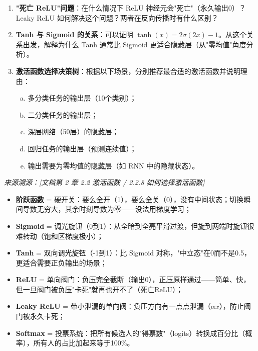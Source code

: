 \documentclass[a4paper,11pt]{ctexart}
\begin{document}
\begin{problembox}
\begin{enumerate}[(1)]
        \item \textbf{"死亡 ReLU"问题}：在什么情况下 ReLU 神经元会"死亡"（永久输出0）？Leaky ReLU 如何解决这个问题？两者在反向传播时有什么区别？

        \item \textbf{Tanh 与 Sigmoid 的关系}：可以证明 $\tanh(x) = 2\sigma(2x) - 1$。从这个关系出发，解释为什么 Tanh 通常比 Sigmoid 更适合隐藏层（从"零均值"角度分析）。

        \item \textbf{激活函数选择决策树}：根据以下场景，分别推荐最合适的激活函数并说明理由：
        \begin{enumerate}[a.]
            \item 多分类任务的输出层（10个类别）；
            \item 二分类任务的输出层；
            \item 深层网络（50层）的隐藏层；
            \item 回归任务的输出层（预测连续值）；
            \item 输出需要为零均值的隐藏层（如 RNN 中的隐藏状态）。
        \end{enumerate}
    \end{enumerate}

    \vspace{0.2cm}
    {\color{gray}\small\textit{来源溯源：[文档第 2 章 2.2 激活函数 / 2.2.8 如何选择激活函数]}}
\end{problembox}

\begin{metaphorbox}
    \begin{itemize}
        \item \textbf{阶跃函数} = 硬开关：要么全开（1），要么全关（0），没有中间状态；切换瞬间导数无穷大，其余时刻导数为零——没法用梯度学习；
        \item \textbf{Sigmoid} = 调光旋钮（0到1）：从全暗到全亮平滑过渡，但旋到两端时旋钮很难转动（饱和区梯度极小）；
        \item \textbf{Tanh} = 双向调光旋钮（-1到1）：比 Sigmoid 对称，"中立态"在0而不是0.5，更适合需要正负输出的场景；
        \item \textbf{ReLU} = 单向阀门：负压完全截断（输出0），正压原样通过——简单、快，但一旦阀门被负压"卡死"就再也开不了（死亡ReLU）；
        \item \textbf{Leaky ReLU} = 带小泄漏的单向阀：负压方向有一点点泄漏（$\alpha x$），防止阀门被永久卡死；
        \item \textbf{Softmax} = 投票系统：把所有候选人的"得票数"（logits）转换成百分比（概率），所有人的占比加起来等于100\%。
    \end{itemize}
\end{metaphorbox}
\end{document}
